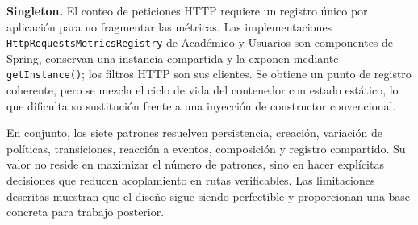 \textbf{Singleton.} El conteo de peticiones HTTP requiere un registro único por
aplicación para no fragmentar las métricas. Las implementaciones
\texttt{HttpRequestsMetricsRegistry} de Académico y Usuarios son componentes de
Spring, conservan una instancia compartida y la exponen mediante
\texttt{getInstance()}; los filtros HTTP son sus clientes. Se obtiene un punto
de registro coherente, pero se mezcla el ciclo de vida del contenedor con estado
estático, lo que dificulta su sustitución frente a una inyección de constructor
convencional.

En conjunto, los siete patrones resuelven persistencia, creación, variación de
políticas, transiciones, reacción a eventos, composición y registro compartido.
Su valor no reside en maximizar el número de patrones, sino en hacer explícitas
decisiones que reducen acoplamiento en rutas verificables. Las limitaciones
descritas muestran que el diseño sigue siendo perfectible y proporcionan una
base concreta para trabajo posterior.

